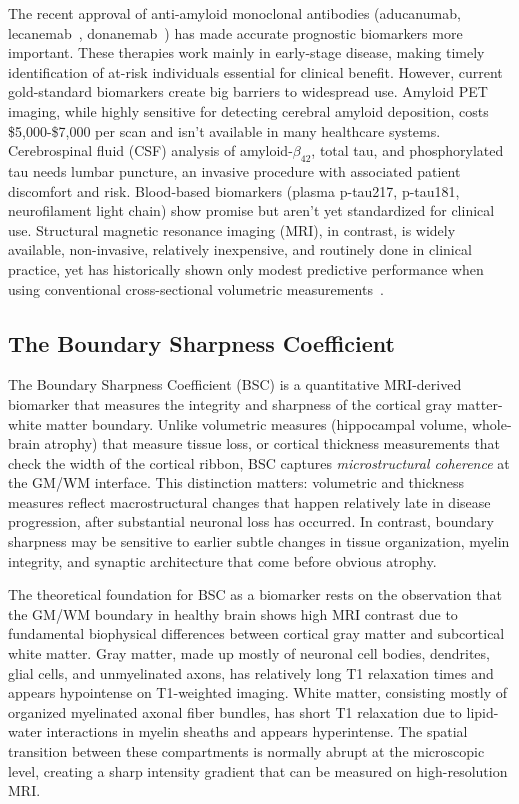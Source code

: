 \documentclass[blue]{ludusofficial}  %
\begin{document}
The recent approval of anti-amyloid monoclonal antibodies (aducanumab, lecanemab~\cite{vanDyck2022lecanemab}, donanemab~\cite{sims2023donanemab}) has made accurate prognostic biomarkers more important. These therapies work mainly in early-stage disease, making timely identification of at-risk individuals essential for clinical benefit. However, current gold-standard biomarkers create big barriers to widespread use. Amyloid PET imaging, while highly sensitive for detecting cerebral amyloid deposition, costs \$5,000-\$7,000 per scan and isn't available in many healthcare systems. Cerebrospinal fluid (CSF) analysis of amyloid-$\beta_{42}$, total tau, and phosphorylated tau needs lumbar puncture, an invasive procedure with associated patient discomfort and risk. Blood-based biomarkers (plasma p-tau217, p-tau181, neurofilament light chain) show promise but aren't yet standardized for clinical use. Structural magnetic resonance imaging (MRI), in contrast, is widely available, non-invasive, relatively inexpensive, and routinely done in clinical practice, yet has historically shown only modest predictive performance when using conventional cross-sectional volumetric measurements~\cite{baytas2024predicting}.

\subsection{The Boundary Sharpness Coefficient}

The Boundary Sharpness Coefficient (BSC) is a quantitative MRI-derived biomarker that measures the integrity and sharpness of the cortical gray matter-white matter boundary. Unlike volumetric measures (hippocampal volume, whole-brain atrophy) that measure tissue loss, or cortical thickness measurements that check the width of the cortical ribbon, BSC captures \textit{microstructural coherence} at the GM/WM interface. This distinction matters: volumetric and thickness measures reflect macrostructural changes that happen relatively late in disease progression, after substantial neuronal loss has occurred. In contrast, boundary sharpness may be sensitive to earlier subtle changes in tissue organization, myelin integrity, and synaptic architecture that come before obvious atrophy.

The theoretical foundation for BSC as a biomarker rests on the observation that the GM/WM boundary in healthy brain shows high MRI contrast due to fundamental biophysical differences between cortical gray matter and subcortical white matter. Gray matter, made up mostly of neuronal cell bodies, dendrites, glial cells, and unmyelinated axons, has relatively long T1 relaxation times and appears hypointense on T1-weighted imaging. White matter, consisting mostly of organized myelinated axonal fiber bundles, has short T1 relaxation due to lipid-water interactions in myelin sheaths and appears hyperintense. The spatial transition between these compartments is normally abrupt at the microscopic level, creating a sharp intensity gradient that can be measured on high-resolution MRI.
\end{document}
